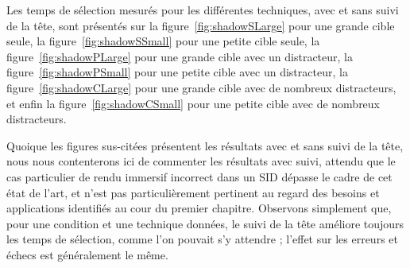 	Les temps de sélection mesurés pour les différentes techniques, avec et sans suivi de la tête, sont présentés sur la figure~\ref{fig:shadowSLarge} pour une grande cible seule, la figure~\ref{fig:shadowSSmall} pour une petite cible seule, la figure~\ref{fig:shadowPLarge} pour une grande cible avec un distracteur, la figure~\ref{fig:shadowPSmall} pour une petite cible avec un distracteur, la figure~\ref{fig:shadowCLarge} pour une grande cible avec de nombreux distracteurs, et enfin la figure~\ref{fig:shadowCSmall} pour une petite cible avec de nombreux distracteurs.
	
	Quoique les figures sus-citées présentent les résultats avec et sans suivi de la tête, nous nous contenterons ici de commenter les résultats avec suivi, attendu que le cas particulier de rendu immersif incorrect dans un SID dépasse le cadre de cet état de l'art, et n'est pas particulièrement pertinent au regard des besoins et applications identifiés au cour du premier chapitre. Observons simplement que, pour une condition et une technique données, le suivi de la tête améliore toujours les temps de sélection, comme l'on pouvait s'y attendre ; l'effet sur les erreurs et échecs est généralement le même.

